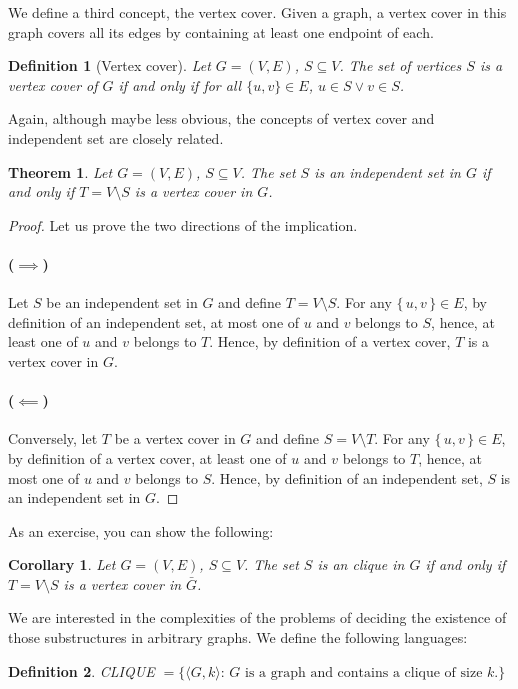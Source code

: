 \documentclass{article}
\newcommand{\theoremname}{Theorem}
\newcommand{\corollaryname}{Corollary}
\newcommand{\definitionname}{Definition}
\newtheorem{theorem}{\theoremname}
\newtheorem{corollary}{\corollaryname}
\newtheorem{definition}{\definitionname}
\newcommand{\st}{\colon\,}
\begin{document}
We define a third concept, the vertex cover. Given a graph, a vertex cover in
this graph covers all its edges by containing at least one endpoint of each.
\begin{definition}[Vertex cover]
  Let $G=(V,E)$, $S\subseteq V$. The set of vertices $S$ is a vertex cover of
  $G$ if and only if for all $\{u,v\} \in E$, $u \in S \lor v \in S$.
\end{definition}

Again, although maybe less obvious, the concepts of vertex cover and
independent set are closely related.
\begin{theorem}\label{is-vc}
  Let $G = (V,E)$, $S \subseteq V$. The set $S$ is an independent set in $G$ if
  and only if $T = V \setminus S$ is a vertex cover in $G$.
\end{theorem}

\begin{proof}
  Let us prove the two directions of the implication.
  \paragraph{($\implies$)}%
  Let $S$ be an independent set in $G$ and define $T = V \setminus S$.
  For any $\{\,u,v\,\} \in E$, by definition of an independent set, at most one
  of $u$ and $v$ belongs to $S$, hence, at least one of $u$ and $v$ belongs to
  $T$. Hence, by definition of a vertex cover, $T$ is a vertex cover in $G$.

  \paragraph{($\impliedby$)}%
  Conversely, let $T$ be a vertex cover in $G$ and define $S = V \setminus T$.
  For any $\{\,u,v\,\} \in E$, by definition of a vertex cover, at least one
  of $u$ and $v$ belongs to $T$, hence, at most one of $u$ and $v$ belongs to
  $S$. Hence, by definition of an independent set, $S$ is an independent set in
  $G$.
\end{proof}

As an exercise, you can show the following:
\begin{corollary}\label{vc-cl}
  Let $G = (V,E)$, $S \subseteq V$. The set $S$ is an clique in $G$ if
  and only if $T = V \setminus S$ is a vertex cover in $\bar{G}$.
\end{corollary}

We are interested in the complexities of the problems of deciding the existence
of those substructures in arbitrary graphs. We define the following languages:
\begin{definition}
  CLIQUE $= \{\langle G,k \rangle \st \text{$G$ is a graph and contains a clique of size $k$.} \}$
\end{definition}
\end{document}
